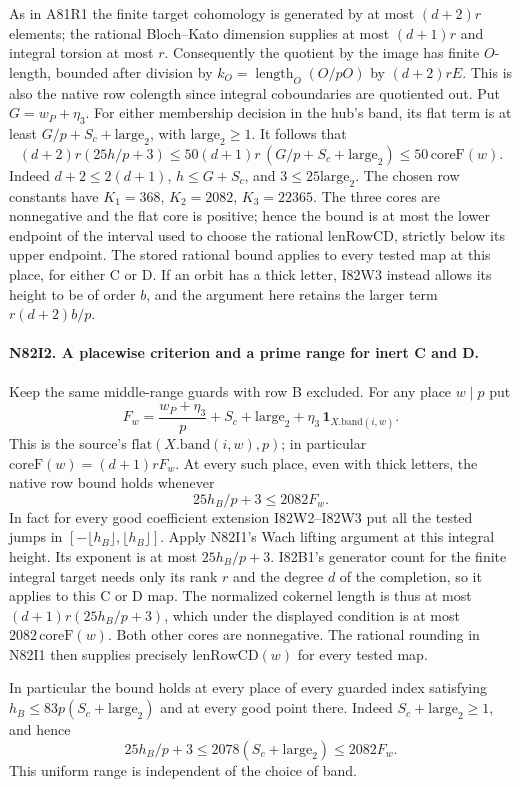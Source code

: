 As in A81R1 the finite target cohomology is generated by at most
$(d+2)r$ elements; the rational Bloch--Kato dimension supplies at
most $(d+1)r$ and integral torsion at most $r$. Consequently the
quotient by the image has finite $O$-length, bounded after division
by $k_O=\operatorname{length}_O(O/pO)$ by $(d+2)rE$. This is
also the native row colength since integral coboundaries are
quotiented out. Put $G=w_P+\eta_3$. For either membership decision
in the hub's band, its flat term is at least
$G/p+S_c+\mathrm{large}_2$, with $\mathrm{large}_2\ge1$.
It follows that
\[
 (d+2)r(25h/p+3)
 \le 50(d+1)r\,(G/p+S_c+\mathrm{large}_2)
 \le 50\,\mathrm{coreF}(w).
\]
Indeed $d+2\le2(d+1)$, $h\le G+S_c$, and $3\le25\mathrm{large}_2$.
The chosen row constants have $K_1=368$, $K_2=2082$,
$K_3=22365$. The three cores are nonnegative and the flat core is
positive; hence the bound is at most the lower endpoint of the
interval used to choose the rational $\mathrm{lenRowCD}$, strictly
below its upper endpoint. The stored rational bound applies to
every tested map at this place, for either C or D. If an orbit has
a thick letter, I82W3 instead allows its height to be of order
$b$, and the argument here retains the larger term $r(d+2)b/p$.

\paragraph{N82I2. A placewise criterion and a prime range for inert C and D.}
Keep the same middle-range guards with row B excluded. For any
place $w\mid p$ put
\[
 F_w=\frac{w_P+\eta_3}{p}+S_c+\mathrm{large}_2
                  +\eta_3\,\mathbf 1_{X.\mathrm{band}(i,w)} .
\]
This is the source's $\mathrm{flat}(X.\mathrm{band}(i,w),p)$;
in particular $\mathrm{coreF}(w)=(d+1)r F_w$.
At every such place, even with thick letters, the native row bound
holds whenever
\[
                       25h_B/p+3\le2082 F_w .
\]
In fact for every good coefficient extension I82W2--I82W3 put
all the tested jumps in $[-\lfloor h_B\rfloor,\lfloor h_B\rfloor]$.
Apply N82I1's Wach lifting argument at this integral height.
Its exponent is at most $25h_B/p+3$. I82B1's generator count
for the finite integral target needs only its rank $r$ and the
degree $d$ of the completion, so it applies to this C or D map.
The normalized cokernel length is thus at most $(d+1)r(25h_B/p+3)$,
which under the displayed condition is at most
$2082\,\mathrm{coreF}(w)$. Both other cores are nonnegative.
The rational rounding in N82I1 then supplies precisely
$\mathrm{lenRowCD}(w)$ for every tested map.

In particular the bound holds at every place of every guarded
index satisfying $h_B\le83p(S_c+\mathrm{large}_2)$ and at every
good point there. Indeed $S_c+\mathrm{large}_2\ge1$, and hence
\[
 25h_B/p+3\le2078(S_c+\mathrm{large}_2)\le2082 F_w .
\]
This uniform range is independent of the choice of band.

